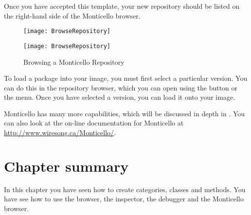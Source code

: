 \documentclass[a4paper,10pt,twoside]{book}
\begin{document}
{%
Once you have accepted this template, your new repository should be listed on the right-hand side of the Monticello browser.

\begin{figure}[hbt]
\ifluluelse
	{\centerline {\texttt{[image: BrowseRepository]}}}
	{\centerline {\texttt{[image: BrowseRepository]}}}
\caption{Browsing a Monticello Repository
}
\end{figure}


To load a package into your image, you must first select a particular version.  You can do this in the repository browser, which you can open using the  button or the \actclick menu.  Once you have selected a version, you can load it onto your image.


Monticello has many more capabilities, which will be discussed in depth in .
You can also look at the on-line documentation for Monticello at \url{http://www.wiresong.ca/Monticello/}.

\section{Chapter summary}
In this chapter you have seen how to create categories, classes and methods.  You have see how to use the browser, the inspector, the debugger and the Monticello browser.

}
\end{document}
